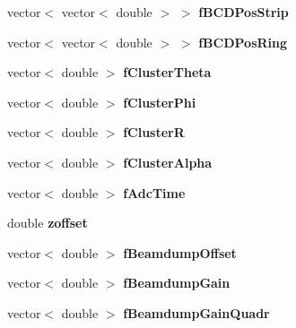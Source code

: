 \begin{DoxyCompactItemize}
\item 
\mbox{\label{class_calibration_a3a011b25d22e065da7cc0e758dc73d63}} 
vector$<$ vector$<$ double $>$ $>$ {\bfseries f\+B\+C\+D\+Pos\+Strip}
\item 
\mbox{\label{class_calibration_a76aaf9355d2e29501ddc97028d9cb02a}} 
vector$<$ vector$<$ double $>$ $>$ {\bfseries f\+B\+C\+D\+Pos\+Ring}
\item 
\mbox{\label{class_calibration_a36c09ce185cc30ee60468f0aa5389cfc}} 
vector$<$ double $>$ {\bfseries f\+Cluster\+Theta}
\item 
\mbox{\label{class_calibration_a10bc108b3509126dff358fc6de052441}} 
vector$<$ double $>$ {\bfseries f\+Cluster\+Phi}
\item 
\mbox{\label{class_calibration_a8955f576f03e78c846e62a86207493c8}} 
vector$<$ double $>$ {\bfseries f\+ClusterR}
\item 
\mbox{\label{class_calibration_a8b7ad3ce59b00024a9380c1d752dcddc}} 
vector$<$ double $>$ {\bfseries f\+Cluster\+Alpha}
\item 
\mbox{\label{class_calibration_ad17489696497c9913e8fed070988fa28}} 
vector$<$ double $>$ {\bfseries f\+Adc\+Time}
\item 
\mbox{\label{class_calibration_ade913c7df571f0a30478efe4c9623de2}} 
double {\bfseries zoffset}
\item 
\mbox{\label{class_calibration_a079c74dbf6c4aa3120f4a5cc84601a59}} 
vector$<$ double $>$ {\bfseries f\+Beamdump\+Offset}
\item 
\mbox{\label{class_calibration_af321228730e63c14c6c87922e0159bda}} 
vector$<$ double $>$ {\bfseries f\+Beamdump\+Gain}
\item 
\mbox{\label{class_calibration_a2e897ae3995fa09e6241a407bc57e3b8}} 
vector$<$ double $>$ {\bfseries f\+Beamdump\+Gain\+Quadr}
\item 
\mbox{\label{class_calibration_aefdfefa1d8aaf1dd0dc4119566f44b79}} 

\end{DoxyCompactItemize}
